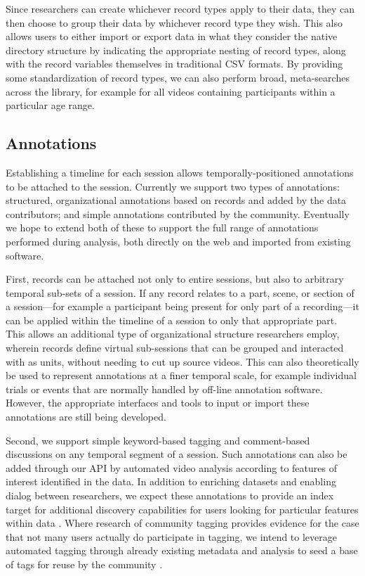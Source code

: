 \documentclass{sig-alternate}
\begin{document}
Since researchers can create whichever record types apply to their data, they can then choose to group their data by whichever record type they wish.
This also allows users to either import or export data in what they consider the native directory structure by indicating the appropriate nesting of record types, along with the record variables themselves in traditional CSV formats.
By providing some standardization of record types, we can also perform broad, meta-searches across the library, for example for all videos containing participants within a particular age range.

\subsection{Annotations}

Establishing a timeline for each session allows temporally-positioned annotations to be attached to the session.
Currently we support two types of annotations: structured, organizational annotations based on records and added by the data contributors; and simple annotations contributed by the community.
Eventually we hope to extend both of these to support the full range of annotations performed during analysis, both directly on the web and imported from existing software.

First, records can be attached not only to entire sessions, but also to arbitrary temporal sub-sets of a session.
If any record relates to a part, scene, or section of a session---for example a participant being present for only part of a recording---it can be applied within the timeline of a session to only that appropriate part.
This allows an additional type of organizational structure researchers employ, wherein records define virtual sub-sessions that can be grouped and interacted with as units, without needing to cut up source videos.
This can also theoretically be used to represent annotations at a finer temporal scale, for example individual trials or events that are normally handled by off-line annotation software.
However, the appropriate interfaces and tools to input or import these annotations are still being developed.

Second, we support simple keyword-based tagging and comment-based discussions on any temporal segment of a session.
Such annotations can also be added through our API by automated video analysis according to features of interest identified in the data.
In addition to enriching datasets and enabling dialog between researchers, we expect these annotations to provide an index target for additional discovery capabilities for users looking for particular features within data \cite{Lanagan_Smeaton_2012}. Where research of community tagging provides evidence for the case that not many users actually do participate in tagging, we intend to leverage automated tagging through already existing metadata and analysis to seed a base of tags for reuse by the community \cite{Yang_Lu_Giles_2011, Farooq_etal_2007}.
\end{document}
